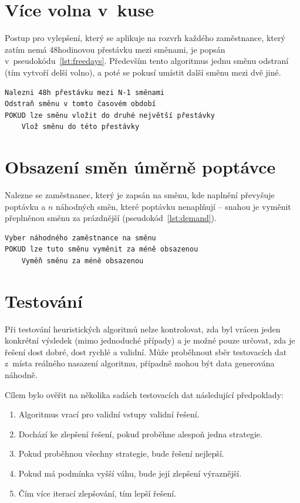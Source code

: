 \documentclass[twoside]{ctuthesis}
\begin{document}
\section{Více volna v~kuse}
Postup pro vylepšení, který se aplikuje na rozvrh každého zaměstnance, který zatím nemá 48hodinovou přestávku mezi směnami, je popsán v~pseudokódu~\ref{lst:freedays}. Především tento algoritmus jednu směnu odstraní (tím vytvoří delší volno), a poté se pokusí umístit další směnu mezi dvě jiné.

\begin{lstlisting}[caption={Strategie pro více volna v~kuse}, label={lst:freedays}]
Nalezni 48h přestávku mezi N-1 směnami
Odstraň směnu v tomto časovém období
POKUD lze směnu vložit do druhé největší přestávky
	Vlož směnu do této přestávky
\end{lstlisting}


\section{Obsazení směn úměrně poptávce}
Nalezne se zaměstnanec, který je zapsán na směnu, kde naplnění převyšuje poptávku a $n$ náhodných směn, které poptávku nenaplňují – snahou je vyměnit přeplněnou směnu za prázdnější (pseudokód~\ref{lst:demand}).

\begin{lstlisting}[caption={Strategie pro obsazení směn dle poptávky}, label={lst:demand}]
Vyber náhodného zaměstnance na směnu
POKUD lze tuto směnu vyměnit za méně obsazenou
	Vyměň směnu za méně obsazenou
\end{lstlisting}

\section{Testování}

Při testování heuristických algoritmů nelze kontrolovat, zda byl vrácen jeden konkrétní výsledek (mimo jednoduché případy) a je možné pouze určovat, zda je řešení dost dobré, dost rychlé a validní. Může proběhnout sběr testovacích dat z~místa reálného nasazení algoritmu, případně mohou být data generována náhodně. \cite{rardin2001experimental}

Cílem bylo ověřit na několika sadách testovacích dat následující předpoklady:
\begin{enumerate}
	\item Algoritmus vrací pro validní vstupy validní řešení.
	\item Dochází ke zlepšení řešení, pokud proběhne alespoň jedna strategie.
	\item Pokud proběhnou všechny strategie, bude řešení nejlepší.
	\item Pokud má podmínka vyšší váhu, bude její zlepšení výraznější.
	\item Čím více iterací zlepšování, tím lepší řešení.
\end{enumerate}
\end{document}
